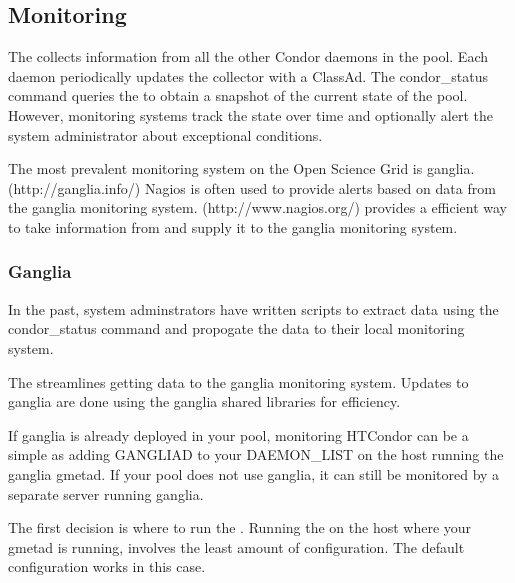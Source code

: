 \subsection{\label{sec:Monitoring}Monitoring}

The  collects information from all the other Condor daemons
in the pool.
Each daemon periodically updates the collector with a ClassAd.
The condor\_status command queries the  to obtain a
snapshot of the current state of the pool.
However, monitoring systems track the state over time and optionally
alert the system administrator about exceptional conditions.

The most prevalent monitoring system on the Open Science Grid is ganglia.
(http://ganglia.info/)
Nagios is often used to provide alerts based on data from the ganglia
monitoring system.
(http://www.nagios.org/)
 provides a efficient way to take information from
 and supply it to the ganglia monitoring system.


\subsubsection{\label{sec:monitor-ganglia}Ganglia}

In the past, system adminstrators have written scripts to extract data
using the condor\_status command and propogate the data to their local
monitoring system.

The  streamlines getting data to the ganglia monitoring
system.
Updates to ganglia are done using the ganglia shared libraries for
efficiency.

If ganglia is already deployed in your pool, monitoring HTCondor can
be a simple as adding GANGLIAD to your DAEMON\_LIST on the host running
the ganglia gmetad.
If your pool does not use ganglia, it can still be monitored by a separate
server running ganglia.

The first decision is where to run the .
Running the  on the host where your gmetad is running,
involves the least amount of configuration.
The default configuration works in this case.

